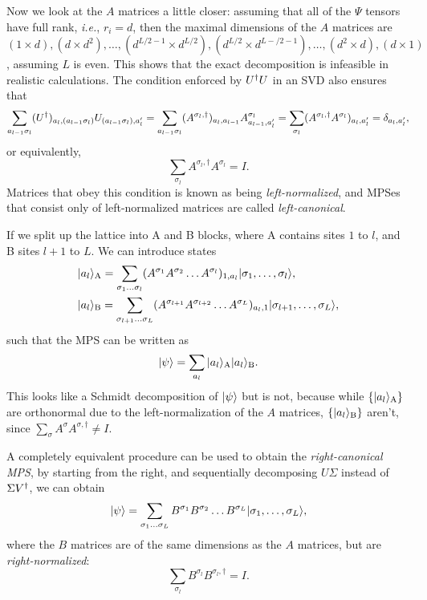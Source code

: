\documentclass{article}
\begin{document}
Now we look at the $A$ matrices a little closer: assuming that all of the $\Psi$ tensors have full rank, \textit{i.e.}, $r_i=d$, then the maximal dimensions of the $A$ matrices are $(1\times d),(d\times d^2),\dots,(d^{L/2-1}\times d^{L/2}),(d^{L/2}\times d^{L-/2-1}),\dots,(d^2\times d),(d\times 1)$, assuming $L$ is even. This shows that the exact decomposition is infeasible in realistic calculations. The condition enforced by $U^{\dagger} U$ in an SVD also ensures that 
\begin{equation}
    \sum_{a_{l-1}\sigma_l}(U^{\dagger})_{a_l,(a_{l-1}\sigma_l)}U_{(a_{l-1}\sigma_l),a_l'}=\sum_{a_{l-1}\sigma_l}(A^{\sigma_l,\dagger})_{a_l,a_{l-1}}A^{\sigma_l}_{a_{l-1},a_l'}=\sum_{\sigma_l}(A^{\sigma_l,\dagger}A^{\sigma_l})_{a_l,a_l'}=\delta_{a_l,a_l'},
\end{equation}
or equivalently,
\begin{equation}
    \sum_{\sigma_l}A^{\sigma_l,\dagger}A^{\sigma_l}=I.
\end{equation}
Matrices that obey this condition is known as being \textit{left-normalized}, and MPSes that consist only of left-normalized matrices are called \textit{left-canonical}.

If we split up the lattice into A and B blocks, where A contains sites $1$ to $l$, and B sites $l+1$ to $L$. We can introduce states
\begin{align}
    &|a_l\rangle_{\mathrm{A}}=\sum_{\sigma_1\dots\sigma_l}(A^{\sigma_1}A^{\sigma_2}\dots A^{\sigma_l})_{1,a_l}|\sigma_1,\dots,\sigma_l\rangle,\\
    &|a_l\rangle_{\mathrm{B}}=\sum_{\sigma_{l+1}\dots\sigma_L}(A^{\sigma_{l+1}}A^{\sigma_{l+2}}\dots A^{\sigma_L})_{a_l,1}|\sigma_{l+1},\dots,\sigma_L\rangle,
\end{align}
such that the MPS can be written as
\begin{equation}
    |\psi\rangle=\sum_{a_l}|a_l\rangle_{\mathrm{A}}|a_l\rangle_{\mathrm{B}}.
\end{equation}
This looks like a Schmidt decomposition of $|\psi\rangle$ but is not, because while $\{|a_l\rangle_{\mathrm{A}}\}$ are orthonormal due to the left-normalization of the $A$ matrices, $\{|a_l\rangle_{\mathrm{B}}\}$ aren't, since $\sum_{\sigma}A^{\sigma}A^{\sigma,\dagger}\neq I$.

A completely equivalent procedure can be used to obtain the \textit{right-canonical MPS}, by starting from the right, and sequentially decomposing $U\Sigma$ instead of $\Sigma V^{\dagger}$, we can obtain
\begin{equation}
    |\psi\rangle=\sum_{\sigma_1\dots\sigma_L}B^{\sigma_1}B^{\sigma_2}\dots B^{\sigma_L}|\sigma_1,\dots,\sigma_L\rangle,
\end{equation}
where the $B$ matrices are of the same dimensions as the $A$ matrices, but are \textit{right-normalized}:
\begin{equation}
    \sum_{\sigma_l}B^{\sigma_l}B^{\sigma_l,\dagger}=I.
\end{equation}
\end{document}
